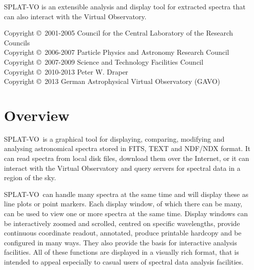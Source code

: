 \documentclass[twoside,11pt]{article}
\newcommand{\stardocinitials}  {SUN}
\newcommand{\stardoccopyright}
{Copyright \copyright\ 2001-2005 Council for the Central Laboratory of the Research Councils \\
Copyright \copyright\ 2006-2007 Particle Physics and Astronomy Research Council\\
Copyright \copyright\ 2007-2009 Science and Technology Facilities Council\\
Copyright \copyright\ 2010-2013 Peter W. Draper\\
Copyright \copyright\ 2013 German Astrophysical Virtual Observatory (GAVO)
}
\newcommand{\stardocnumber}    {243.41}
\newcommand{\stardocabstract}  {
\textsf{SPLAT-VO} is an extensible analysis and display tool for extracted
spectra that can also interact with the Virtual Observatory.
}
\newcommand{\stardocname}{\stardocinitials /\stardocnumber}
\newenvironment{latexonly}{}{}
\newcommand{\xlabel}[1]{}
\renewcommand{\_}{\texttt{\symbol{95}}}
\newcommand{\SPLAT}{\textsf{SPLAT-VO}}
\renewcommand{\thepage}{\roman{page}}
\begin{document}
\begin{center}
\stardocabstract
\end{center}

\begin{latexonly}
\newpage
\vspace*{\fill}
\stardoccopyright
\end{latexonly}

\newpage
\begin{latexonly}
  \setlength{\parskip}{0mm}
  \tableofcontents
  \setlength{\parskip}{\medskipamount}
  \markboth{\stardocname}{\stardocname}
\end{latexonly}

\cleardoublepage
\renewcommand{\thepage}{\arabic{page}}
\setcounter{page}{1}


\section{Overview\xlabel{overview}}

\SPLAT\ is a graphical tool for displaying, comparing, modifying and analysing
astronomical spectra stored in FITS, TEXT and NDF/NDX format. It can read
spectra from local disk files, download them over the Internet, or it can
interact with the Virtual Observatory and query servers for spectral data in a
region of the sky.

\SPLAT\ can handle many spectra at the same time and will display these as
line plots or point markers.
Each display window, of which there can be many, can be used to
view one or more spectra at the same time.
Display windows can be interactively zoomed and scrolled, centred on
specific wavelengths, provide continuous coordinate readout, annotated,
produce printable hardcopy and be configured in many ways.
They also provide the basis for interactive analysis facilities.
All of these functions are displayed in a visually rich format, that
is intended to appeal especially to casual users of spectral data
analysis facilities.
\end{document}
